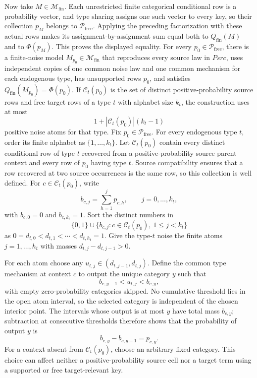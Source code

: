 Now take \(M\in\mathcal M_{\mathrm{fin}}\).  Each unrestricted finite categorical conditional row is a probability vector, and type sharing assigns one such vector to every key, so their collection \(p_M\) belongs to \(\mathcal P_{\mathrm{free}}\).  Applying the preceding factorization with these actual rows makes its assignment-by-assignment sum equal both to \(Q_{\mathrm{fin}}(M)\) and to \(\Phi(p_M)\).  This proves the displayed equality.
For every \(p_0\in\mathcal P_{\mathrm{free}}\), there is a finite-noise model \(M_{p_0}\in\mathcal M_{\mathrm{fin}}\) that reproduces every source law in \(Psrc\), uses independent copies of one common noise law and one common mechanism for each endogenous type, has unsupported rows \(p_0\), and satisfies \(Q_{\mathrm{fin}}(M_{p_0})=\Phi(p_0)\).  If \(\mathcal C_t(p_0)\) is the set of distinct positive-probability source rows and free target rows of a type \(t\) with alphabet size \(k_t\), the construction uses at most
\[
 1+|\mathcal C_t(p_0)|(k_t-1)
\]
positive noise atoms for that type.
Fix \(p_0\in\mathcal P_{\mathrm{free}}\).  For every endogenous type \(t\), order its finite alphabet as \(\{1,\ldots,k_t\}\).  Let \(\mathcal C_t(p_0)\) contain every distinct conditional row of type \(t\) recovered from a positive-probability source parent context and every row of \(p_0\) having type \(t\).  Source compatibility ensures that a row recovered at two source occurrences is the same row, so this collection is well defined.  For \(c\in\mathcal C_t(p_0)\), write
\[
 b_{c,j}=\sum_{h=1}^j p_{c,h},\qquad j=0,\ldots,k_t,
\]
with \(b_{c,0}=0\) and \(b_{c,k_t}=1\).  Sort the distinct numbers in
\[
 \{0,1\}\cup\{b_{c,j}:c\in\mathcal C_t(p_0),\ 1\leq j<k_t\}
\]
as \(0=d_{t,0}<d_{t,1}<\cdots<d_{t,h_t}=1\).  Give the type-\(t\) noise the finite atoms \(j=1,\ldots,h_t\) with masses \(d_{t,j}-d_{t,j-1}>0\).

For each atom choose any \(u_{t,j}\in(d_{t,j-1},d_{t,j})\).  Define the common type mechanism at context \(c\) to output the unique category \(y\) such that
\[
 b_{c,y-1}<u_{t,j}<b_{c,y},
\]
with empty zero-probability categories skipped.  No cumulative threshold lies in the open atom interval, so the selected category is independent of the chosen interior point.  The intervals whose output is at most \(y\) have total mass \(b_{c,y}\); subtraction at consecutive thresholds therefore shows that the probability of output \(y\) is
\[
 b_{c,y}-b_{c,y-1}=p_{c,y}.
\]
For a context absent from \(\mathcal C_t(p_0)\), choose an arbitrary fixed category.  This choice can affect neither a positive-probability source cell nor a target term using a supported or free target-relevant key.

